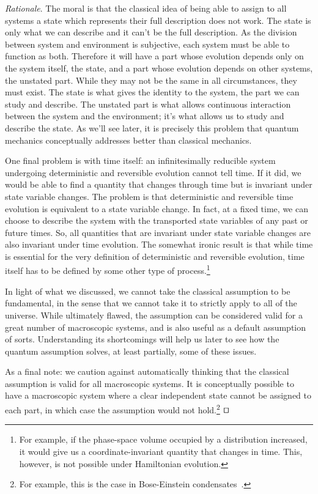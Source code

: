 \documentclass[smallextended]{svjour3}
\numberwithin{equation}{section}
\newenvironment{rationale}{\emph{Rationale}.}{\hfill\(\qed\)}
\theoremstyle{definition}
\newenvironment{rationale}{\emph{Rationale}.}{\qed}
\begin{document}
\begin{rationale}
	The moral is that the classical idea of being able to assign to all systems a state which represents their full description does not work. The state is only what we can describe and it can't be the full description. As the division between system and environment is subjective, each system must be able to function as both. Therefore it will have a part whose evolution depends only on the system itself, the state, and a part whose evolution depends on other systems, the unstated part. While they may not be the same in all circumstances, they must exist. The state is what gives the identity to the system, the part we can study and describe. The unstated part is what allows continuous interaction between the system and the environment; it's what allows us to study and describe the state. As we'll see later, it is precisely this problem that quantum mechanics conceptually addresses better than classical mechanics.
	
	One final problem is with time itself: an infinitesimally reducible system undergoing deterministic and reversible evolution cannot tell time. If it did, we would be able to find a quantity that changes through time but is invariant under state variable changes. The problem is that deterministic and reversible time evolution is equivalent to a state variable change. In fact, at a fixed time, we can choose to describe the system with the transported state variables of any past or future times. So, all quantities that are invariant under state variable changes are also invariant under time evolution. The somewhat ironic result is that while time is essential for the very definition of deterministic and reversible evolution, time itself has to be defined by some other type of process.\footnote{For example, if the phase-space volume occupied by a distribution increased, it would give us a coordinate-invariant quantity that changes in time. This, however, is not possible under Hamiltonian evolution.}
	
	In light of what we discussed, we cannot take the classical assumption to be fundamental, in the sense that we cannot take it to strictly apply to all of the universe. While ultimately flawed, the  assumption can be considered valid for a great number of macroscopic systems, and is also useful as a default assumption of sorts. Understanding its shortcomings will help us later to see how the quantum assumption solves, at least partially, some of these issues.
	
	As a final note: we caution against automatically thinking that the classical assumption is valid for all macroscopic systems. It is conceptually possible to have a macroscopic system where a clear independent state cannot be assigned to each part, in which case the assumption would not hold.\footnote{For example, this is the case in Bose-Einstein condensates~\cite{BEC}.}
\end{rationale}
\end{document}
